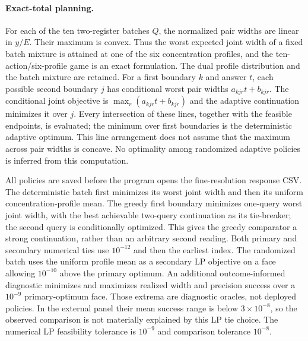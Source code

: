 \paragraph{Exact-total planning.}
For each of the ten two-register batches $Q$, the normalized pair widths
are linear in $y/E$. Their maximum is convex. Thus the worst expected joint
width of a fixed batch mixture is attained at one of the six concentration
profiles, and the ten-action/six-profile game is an exact formulation.
The dual profile distribution and the batch mixture are retained. For a
first boundary $k$ and answer $t$, each possible second boundary $j$ has
conditional worst pair widths $a_{kjr}t+b_{kjr}$.
The conditional joint objective is $\max_r(a_{kjr}t+b_{kjr})$ and the
adaptive continuation minimizes it over $j$. Every intersection of these
lines, together with the feasible endpoints, is evaluated; the minimum over
first boundaries is the deterministic adaptive optimum. This line arrangement
does not assume that the maximum across pair widths is concave. No optimality
among randomized adaptive policies is inferred from this computation.

All policies are saved before the program opens the fine-resolution response
CSV. The deterministic batch first minimizes its worst joint width and then
its uniform concentration-profile mean. The greedy first boundary minimizes
one-query worst joint width, with the best achievable two-query continuation
as its tie-breaker; the second query is conditionally optimized. This gives
the greedy comparator a strong continuation, rather than an arbitrary second
reading. Both primary and secondary numerical ties use $10^{-12}$ and then
the earliest index. The randomized batch uses the uniform profile mean as a
secondary LP objective on a face allowing $10^{-10}$ above the primary
optimum. An additional outcome-informed diagnostic minimizes and maximizes
realized width and precision success over a $10^{-9}$ primary-optimum face.
Those extrema are diagnostic oracles, not deployed policies. In the external
panel their mean success range is below $3\times10^{-8}$, so the observed
comparison is not materially explained by this LP tie choice. The numerical
LP feasibility tolerance is $10^{-9}$ and comparison tolerance $10^{-8}$.

